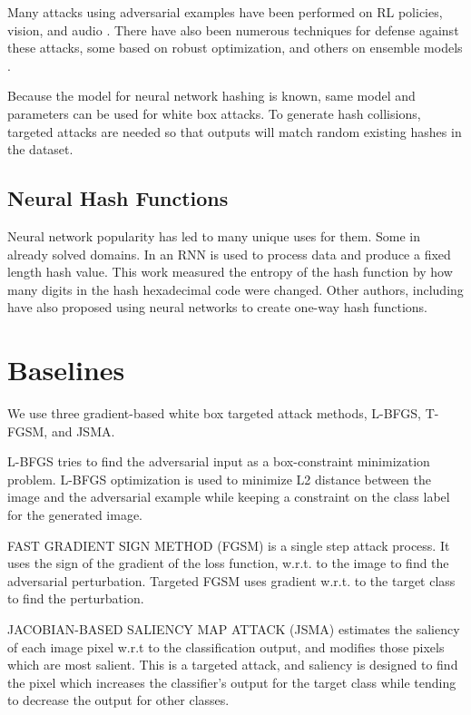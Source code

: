\documentclass{article}
\begin{document}
Many attacks using adversarial examples have been performed on RL policies, vision,
and audio \cite{policy,intriguing,audio}. There have also been numerous techniques
for defense against these attacks, some based on robust optimization, and others
on ensemble models \cite{robust,ensemble}.

Because the model for neural network hashing is known, same model and parameters can be used for white box attacks. To generate hash collisions, targeted attacks are needed so that outputs will match random existing hashes in the dataset. 


\subsection{Neural Hash Functions}

Neural network popularity has led to many unique uses for them. Some in already
solved domains. In \cite{hash1} an RNN is used to process data and produce
a fixed length hash value. This work measured the entropy of the hash function
by how many digits in the hash hexadecimal code were changed. Other authors,
including \cite{hash2} have also proposed using neural networks to create
one-way hash functions.

\section{Baselines}
We use three gradient-based white box targeted attack methods, L-BFGS, T-FGSM, and JSMA.

L-BFGS
tries to find the adversarial input as a box-constraint minimization problem. L-BFGS optimization is used to minimize L2 distance between the image and the adversarial example while keeping a constraint on the class label for the generated image.

FAST GRADIENT SIGN METHOD (FGSM)
is a single step attack process. It uses the sign of the gradient of the loss function, w.r.t. to the image to find the adversarial perturbation. 
Targeted FGSM uses gradient w.r.t. to the target class to find the perturbation.
	
JACOBIAN-BASED SALIENCY MAP ATTACK (JSMA)
estimates the saliency of each image pixel w.r.t to the classification output, and modifies those pixels which are most salient. This is a targeted attack, and saliency is designed to find the pixel which increases the classifier’s output for the target class while tending to decrease the output for other classes.
\end{document}
